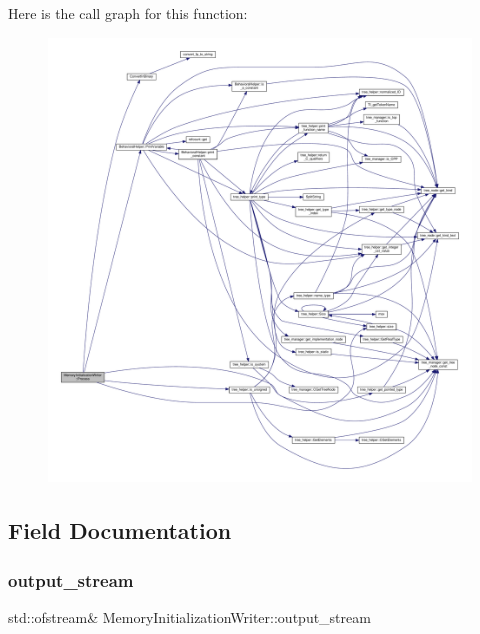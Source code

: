 Here is the call graph for this function\+:
\nopagebreak
\begin{figure}[H]
\begin{center}
\leavevmode
\includegraphics[width=350pt]{d4/d8a/classMemoryInitializationWriter_a7a4a0905d7608fefb20b426df5a845aa_cgraph}
\end{center}
\end{figure}


\subsection{Field Documentation}
\mbox{\label{classMemoryInitializationWriter_aa7aba789c5f4692832a725b497941c1e}} 
\subsubsection{\texorpdfstring{output\+\_\+stream}{output\_stream}}
{\footnotesize\ttfamily std\+::ofstream\& Memory\+Initialization\+Writer\+::output\+\_\+stream\hspace{0.3cm}{\ttfamily [protected]}}



